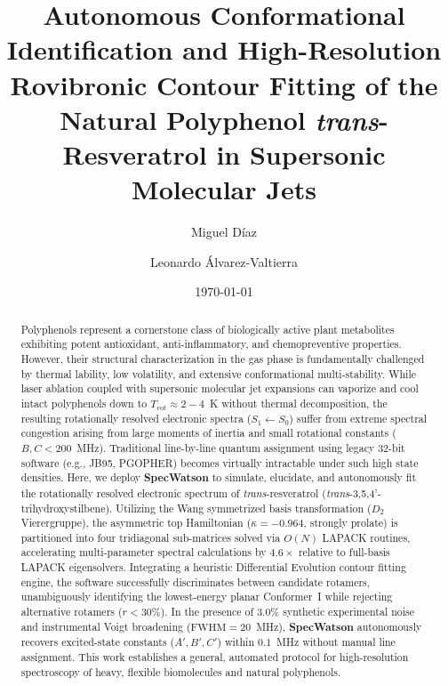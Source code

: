 \documentclass[aps,jcp,reprint,twocolumn,superscriptaddress,showpacs,amsmath,amssymb]{revtex4-2}
\begin{document}
\title{Autonomous Conformational Identification and High-Resolution Rovibronic Contour Fitting of the Natural Polyphenol \textit{trans}-Resveratrol in Supersonic Molecular Jets}

\author{Miguel D\'iaz}

\author{Leonardo \'Alvarez-Valtierra}

\date{\today}

\begin{abstract}
Polyphenols represent a cornerstone class of biologically active plant metabolites exhibiting potent antioxidant, anti-inflammatory, and chemopreventive properties. However, their structural characterization in the gas phase is fundamentally challenged by thermal lability, low volatility, and extensive conformational multi-stability. While laser ablation coupled with supersonic molecular jet expansions can vaporize and cool intact polyphenols down to $T_{rot} \approx 2 - 4$~K without thermal decomposition, the resulting rotationally resolved electronic spectra ($S_1 \leftarrow S_0$) suffer from extreme spectral congestion arising from large moments of inertia and small rotational constants ($B, C < 200$~MHz). Traditional line-by-line quantum assignment using legacy 32-bit software (e.g., JB95, PGOPHER) becomes virtually intractable under such high state densities. Here, we deploy \textbf{SpecWatson} to simulate, elucidate, and autonomously fit the rotationally resolved electronic spectrum of \textit{trans}-resveratrol (\textit{trans}-3,5,4'-trihydroxystilbene). Utilizing the Wang symmetrized basis transformation ($D_2$ Vierergruppe), the asymmetric top Hamiltonian ($\kappa = -0.964$, strongly prolate) is partitioned into four tridiagonal sub-matrices solved via $O(N)$ LAPACK routines, accelerating multi-parameter spectral calculations by $4.6\times$ relative to full-basis LAPACK eigensolvers. Integrating a heuristic Differential Evolution contour fitting engine, the software successfully discriminates between candidate rotamers, unambiguously identifying the lowest-energy planar Conformer~I while rejecting alternative rotamers ($r < 30\%$). In the presence of $3.0\%$ synthetic experimental noise and instrumental Voigt broadening ($\text{FWHM} = 20$~MHz), \textbf{SpecWatson} autonomously recovers excited-state constants ($A', B', C'$) within $0.1$~MHz without manual line assignment. This work establishes a general, automated protocol for high-resolution spectroscopy of heavy, flexible biomolecules and natural polyphenols.
\end{abstract}
\end{document}
